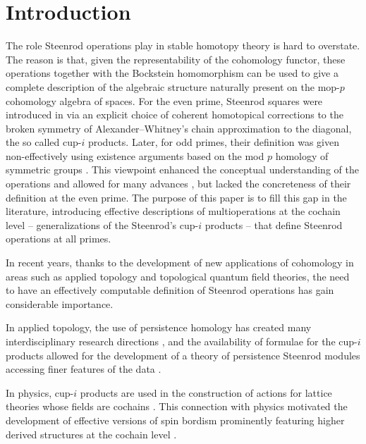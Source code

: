
\section{Introduction} \label{s:introduction}

The role Steenrod operations play in stable homotopy theory is hard to overstate.
The reason is that, given the representability of the cohomology functor, these operations together with the Bockstein homomorphism can be used to give a complete description of the algebraic structure naturally present on the mop-$p$ cohomology algebra of spaces.
For the even prime, Steenrod squares were introduced in \cite{steenrod1947products} via an explicit choice of coherent homotopical corrections to the broken symmetry of Alexander--Whitney's chain approximation to the diagonal, the so called cup-$i$ products.
Later, for odd primes, their definition was given non-effectively using existence arguments based on the mod $p$ homology of symmetric groups \cite{steenrod1952reduced, steenrod1962cohomology, steenrod1962cohomology}.
This viewpoint enhanced the conceptual understanding of the operations and allowed for many advances \cite{adem1952iteration, milnor1958dual, adams1995stable}, but lacked the concreteness of their definition at the even prime.
The purpose of this paper is to fill this gap in the literature, introducing effective descriptions of multioperations at the cochain level -- generalizations of the Steenrod's cup-$i$ products -- that define Steenrod operations at all primes.

In recent years, thanks to the development of new applications of cohomology in areas such as applied topology and topological quantum field theories, the need to have an effectively computable definition of Steenrod operations has gain considerable importance.

In applied topology, the use of persistence homology \cite{edelsbrunner2002topological, carlsson2005barcode} has created many interdisciplinary research directions \cite{chan2013viral, hess2017cliques}, and the availability of formulae for the cup-$i$ products allowed for the development of a theory of persistence Steenrod modules accessing finer features of the data \cite{medina2018persistence}.

In physics, cup-$i$ products are used in the construction of actions for lattice theories whose fields are cochains \cite{gaiotto2016spin, bhardwaj2017fermionic, kapustin2017fermionic}.
This connection with physics motivated the development of effective versions of spin bordism \cite{brumfiel2016pontrjagin, brumfiel2018pontrjagin} prominently featuring higher derived structures at the cochain level \cite{medina2020cartan, medina2021adem}.

